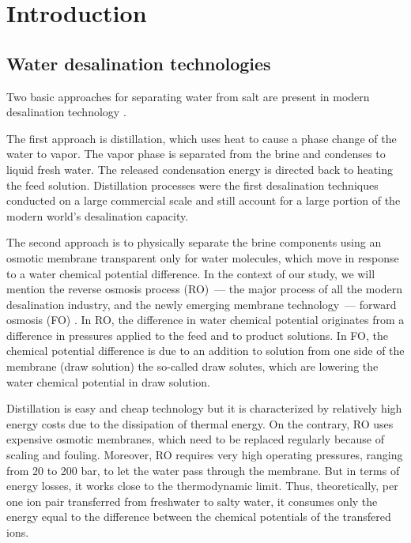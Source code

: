 \documentclass[journal,article,submit,pdftex,moreauthors]{Definitions/mdpi}
\begin{document}




\section{Introduction\label{sec: intro}}
\subsection{Water desalination technologies}
Two basic approaches for separating water from salt are present in modern desalination technology \cite{Miller2003,Curto2021}.

The first approach is distillation, which uses heat to cause a phase change of the water to vapor. The vapor phase is separated from the brine and condenses to liquid fresh water. 
The released condensation energy is directed back to heating the feed solution.
Distillation processes were the first desalination techniques conducted on a large commercial scale and still account for a large portion of the modern world’s desalination capacity.

The second approach is to physically separate the brine components using an osmotic membrane transparent only for water molecules, which move in response to a water chemical potential difference.
In the context of our study, we will mention the reverse osmosis process (RO)~--- the major process of all the modern desalination industry, and the newly emerging membrane
technology~--- forward osmosis (FO) \cite{Akther2015}. 
In RO, the difference in water chemical potential originates from a difference in pressures applied to the feed and to product solutions. 
In FO, the chemical potential difference is due to an addition to solution from one side of the membrane (draw solution) the so-called draw solutes, which are lowering the water chemical potential in draw solution.


Distillation is easy and cheap technology but it is characterized by relatively high energy costs due to the dissipation of thermal energy. 
On the contrary, RO uses expensive osmotic membranes, which need to be replaced regularly because of scaling and fouling. 
Moreover, RO requires very high operating pressures, ranging from 20 to 200 bar, to let the water pass through the membrane. 
But in terms of energy losses, it works close to the thermodynamic limit.
Thus, theoretically, per one ion pair transferred from freshwater to salty water, it consumes only the energy equal to the difference between the chemical potentials of the transfered ions.
\end{document}
